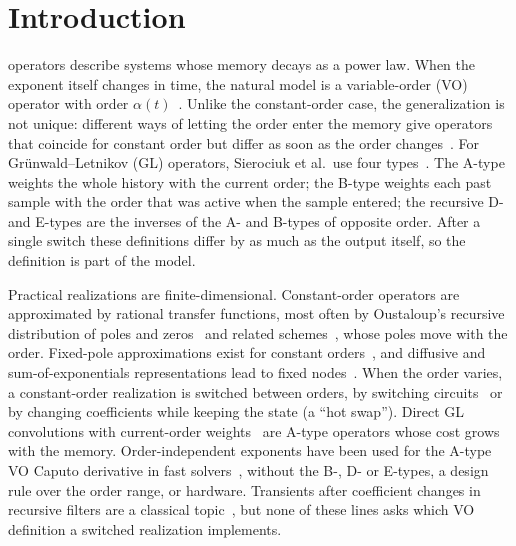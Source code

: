 \section{Introduction}\label{sec:intro}

 operators describe systems whose memory decays as a power law. When the exponent itself changes in time, the natural model is a variable-order (VO) operator with order $\alpha(t)$~. Unlike the constant-order case, the generalization is not unique: different ways of letting the order enter the memory give operators that coincide for constant order but differ as soon as the order changes~. For Gr\"unwald--Letnikov (GL) operators, Sierociuk et al.\ use four types~. The A-type weights the whole history with the current order; the B-type weights each past sample with the order that was active when the sample entered; the recursive D- and E-types are the inverses of the A- and B-types of opposite order. After a single switch these definitions differ by as much as the output itself, so the definition is part of the model.

Practical realizations are finite-dimensional. Constant-order operators are approximated by rational transfer functions, most often by Oustaloup's recursive distribution of poles and zeros~\cite{oustaloup2000} and related schemes~, whose poles move with the order. Fixed-pole approximations exist for constant orders~, and diffusive and sum-of-exponentials representations lead to fixed nodes~. When the order varies, a constant-order realization is switched between orders, by switching circuits~ or by changing coefficients while keeping the state (a ``hot swap''). Direct GL convolutions with current-order weights~\cite{tolba2020,oziablo2020} are A-type operators whose cost grows with the memory. Order-independent exponents have been used for the A-type VO Caputo derivative in fast solvers~, without the B-, D- or E-types, a design rule over the order range, or hardware. Transients after coefficient changes in recursive filters are a classical topic~, but none of these lines asks which VO definition a switched realization implements.



